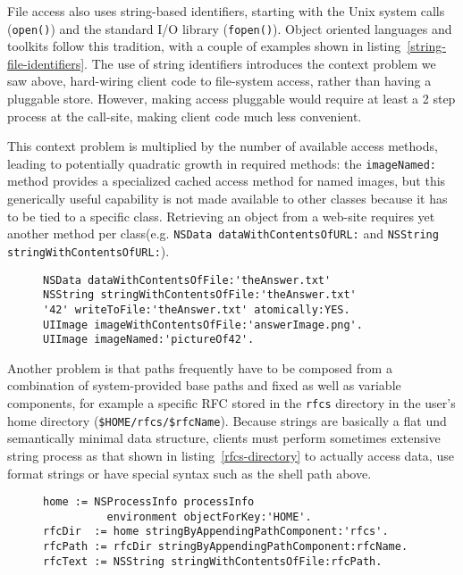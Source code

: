 \documentclass[preprint,authoryear]{llncs}
\begin{document}
File access also uses string-based identifiers, starting with the Unix system calls ({\tt open()}) and the standard I/O library ({\tt fopen()}).
Object oriented languages and toolkits follow this tradition, with a couple of examples shown in listing~\ref{string-file-identifiers}.
The use of string identifiers introduces the context problem we saw above, hard-wiring client code to file-system access,
rather than having a pluggable store.   However, making access pluggable would require at least a 2 step process at the
call-site, making client code much less convenient.  

This context problem is multiplied by the number of available access methods, leading to potentially quadratic growth in
required methods:
the {\tt imageNamed:} method provides a specialized cached access method for named images, but this generically useful
capability is not made available to other classes because it has to be tied to a specific class.  Retrieving an object from
a web-site requires yet another method per class(e.g. {\tt NSData dataWithContentsOfURL:} and {\tt NSString stringWithContentsOfURL:}).



\begin{figure}[htbp]
\begin{lstlisting}[style=numbers,label=string-file-identifiers,caption=Files of different types accessed using string identifiers.]
NSData dataWithContentsOfFile:'theAnswer.txt'
NSString stringWithContentsOfFile:'theAnswer.txt'
'42' writeToFile:'theAnswer.txt' atomically:YES.
UIImage imageWithContentsOfFile:'answerImage.png'.
UIImage imageNamed:'pictureOf42'.
\end{lstlisting}
\end{figure}

Another problem is that paths frequently have to be composed from a combination of system-provided base paths
and fixed as well as variable components, for example a specific RFC stored in the {\tt rfcs} directory in the user's
home directory ({\tt \$HOME/rfcs/\$rfcName}).  Because strings are basically a flat und semantically minimal data structure, clients
must perform sometimes extensive string process as that shown in listing~\ref{rfcs-directory} to actually access
data, use format strings or have special syntax such as the shell path above.

\begin{figure}[htbp]
\begin{lstlisting}[style=numbers,label=rfcs-directory,caption=Accessing a specific RFC in a directory relative to the user's \$HOME.]
home := NSProcessInfo processInfo 
          environment objectForKey:'HOME'.
rfcDir  := home stringByAppendingPathComponent:'rfcs'.
rfcPath := rfcDir stringByAppendingPathComponent:rfcName.
rfcText := NSString stringWithContentsOfFile:rfcPath.
\end{lstlisting}
\end{figure}
\end{document}

